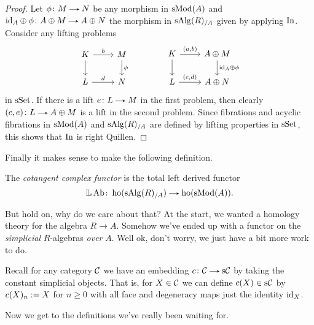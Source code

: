 \begin{proof}
  Let $\phi \c M \to N$ be any morphism in $\mathrm{s}\mathrm{Mod}(A)$ and $\id_A
  \oplus \phi\c A \oplus M \to A \oplus N$ the morphism in
  $\mathrm{s}\mathrm{Alg}(R)_{/A}$ given by applying $\operatorname{In}$. Consider any lifting
  problems
  \[
  \begin{tikzcd}
    K \rar{b} \dar & M \dar{\phi} \\ L \rar{d} & N
  \end{tikzcd}
  \hspace{40pt}
  \begin{tikzcd}
    K \rar{(a,b)} \dar & A \oplus M \dar{\id_A \oplus \phi} \\ L
    \rar{(c,d)} & A \oplus N
  \end{tikzcd}
  \]
  in $\mathrm{s}\mathrm{Set}$. If there is a lift $e \c L \to M$ in the first problem,
  then clearly $(c,e) \c L \to A \oplus M$ is a lift in the second
  problem. Since fibrations and acyclic fibrations in $\mathrm{s}\mathrm{Mod}(A)$ and
  $\mathrm{s}\mathrm{Alg}(R)_{/A}$ are defined by lifting properties in $\mathrm{s}\mathrm{Set}$, this
  shows that $\operatorname{In}$ is right Quillen.
\end{proof}

Finally it makes sense to make the following definition.

\begin{definition}
  The \emph{cotangent complex functor} is the total left derived
  functor
  \[
  \L\Ab \c \ho(\s\Alg(R)_{/A}) \to \ho(\s\Mod(A)).
  \]
\end{definition}

But hold on, why do we care about that? At the start, we wanted a
homology theory for the algebra $R \to A$. Somehow we've ended up with
a functor on the \emph{simplicial} $R$-algebras \emph{over} $A$. Well
ok, don't worry, we just have a bit more work to do.

\begin{nothing}
  \label{constant}
  Recall for any category $\mathcal{C}$ we have an embedding $c \c \C \to \s\C$
  by taking the constant simplicial objects. That is, for $X \in \mathcal{C}$
  we can define $c(X) \in \mathrm{s}\mathcal{C}$ by $c(X)_n \mathrel{:=} X$ for $n \ge 0$
  with all face and degeneracy maps just the identity $\mathrm{id}_X$.
\end{nothing}

Now we get to the definitions we've really been waiting for.

